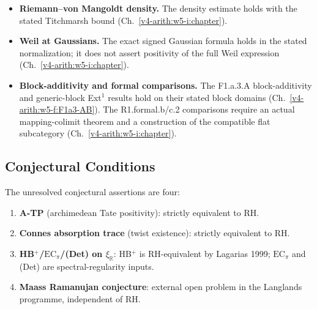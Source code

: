 \begin{itemize}
\(N_{\mathrm{BC}}=-\tfrac12\log\Delta_1\) has point spectrum
\(\tfrac12\log\mathbb Q_{>0}\), each eigenvalue of countably infinite
multiplicity, and closed spectrum \(\mathbb R\)
(Theorem~\ref{v4-arith:w5-b:thm:N-BC-self-adjoint}). Its restriction
\(N_{\mathrm{occ}}=N_{\mathrm{BC}}|_{K_2}\) to the reducing subspace
\(K_2=\overline{\operatorname{span}}\{\mu_{m^2}\Omega_1:m\ge1\}\)
has spectrum \(\{\log m:m\ge1\}\), by the weighted occupation
embedding of Lemma~\ref{v4-arith:w5-b:lem:zero-mode-embeds-gns}.
Neither construction identifies a zeta-zero spectrum.
\item \textbf{Riemann--von Mangoldt density.} The density estimate
holds with the stated Titchmarsh bound (Ch.~\ref{v4-arith:w5-i:chapter}).
\item \textbf{Weil at Gaussians.} The exact signed Gaussian formula
holds in the stated normalization; it does not assert positivity of
the full Weil expression (Ch.~\ref{v4-arith:w5-i:chapter}).
\item \textbf{Block-additivity and formal comparisons.} The
F1.a.3.A block-additivity and generic-block Ext\({}^{1}\) results hold
on their stated block domains (Ch.~\ref{v4-arith:w5-f:F1a3-AB}). The R1.formal.b/c.2 comparisons
require an actual mapping-colimit theorem and a construction of the
compatible flat subcategory (Ch.~\ref{v4-arith:w5-i:chapter}).
\end{itemize}

\subsection{Conjectural Conditions}
\label{v4-arith:w5-synth:residual-conjectures}

The unresolved conjectural assertions are four:

\begin{enumerate}
\item \textbf{A-TP} (archimedean Tate positivity): strictly
equivalent to RH.
\item \textbf{Connes absorption trace} (twist existence):
strictly equivalent to RH.
\item \textbf{HB\(^{+}\)/\(\mathrm{EC}_\pi\)/(Det) on \(\xi_{\mathbb{R}}\)}:
HB\(^{+}\) is RH-equivalent by Lagarias 1999; \(\mathrm{EC}_\pi\) and (Det)
are spectral-regularity inputs.
\item \textbf{Maass Ramanujan conjecture}: external open problem
in the Langlands programme, independent of RH.
\end{enumerate}

